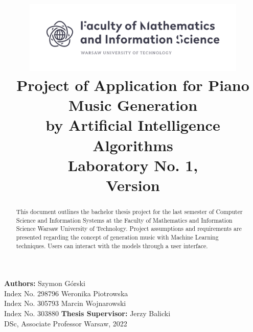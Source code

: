 \documentclass{article}
\title{\includegraphics[width=0.8\textwidth]{MINI.png} \\ Project of Application for Piano Music Generation \\ by Artificial Intelligence Algorithms \\ [0.35em]\large Laboratory No. 1, \\ Version \currentversion }
\author{}
\date{}
\begin{document}
\maketitle
\begin{center}
    \normalsize\textbf{Authors:}
    \vskip10pt
    \Large{Szymon Górski} \\
    \large{Index No. 298796}
    \vskip10pt
    \Large{Weronika Piotrowska} \\
    \large{Index No. 305793}
    \vskip10pt
    \Large{Marcin Wojnarowski} \\
    \large{Index No. 303880}
    \vskip50pt
    \normalsize\textbf{Thesis Supervisor:}
    \vskip10pt
    \Large{Jerzy Balicki} \\
    \large{DSc, Associate Professor}
    \vfill
    \large{Warsaw, 2022}
\end{center}

\newpage
\begin{abstract}
    This document outlines the bachelor thesis project for the last semester of Computer Science and Information Systems at the Faculty of Mathematics and Information Science Warsaw University of Technology. Project assumptions and requirements are presented regarding the concept of generation music with Machine Learning techniques. Users can interact with the models through a user interface.
\end{abstract}

\vskip50pt
\end{document}
